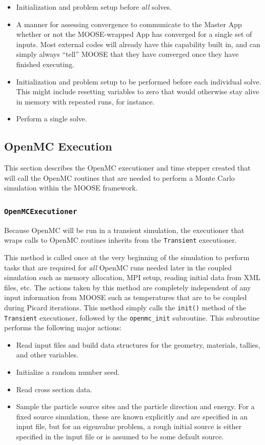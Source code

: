 \documentclass[10pt]{article}
\newcounter{subsubsubsection}[subsubsection]
\numberwithin{equation}{section} %
\begin{document}
\begin{itemize}
\item Initialization and problem setup before {\it all} solves.
\item A manner for assessing convergence to communicate to the Master App whether or not the MOOSE-wrapped App has converged for a single set of inputs. Most external codes will already have this capability built in, and can simply always ``tell'' MOOSE that they have converged once they have finished executing.
\item Initialization and problem setup to be performed before each individual solve. This might include resetting variables to zero that would otherwise stay alive in memory with repeated runs, for instance.
\item Perform a single solve.
\end{itemize}

\subsection{OpenMC Execution}
This section describes the OpenMC executioner and time stepper created that will call the OpenMC routines that are needed to perform a Monte Carlo simulation within the MOOSE framework. 

\subsubsection{{\tt OpenMCExecutioner}}
Because OpenMC will be run in a transient simulation, the executioner that wraps calls to OpenMC routines inherits from the {\tt Transient} executioner.

This method is called once at the very beginning of the simulation to perform tasks that are required for {\it all} OpenMC runs needed later in the coupled simulation such as memory allocation, MPI setup, reading initial data from XML files, etc. The actions taken by this method are completely independent of any input information from MOOSE such as temperatures that are to be coupled during Picard iterations. This method simply calls the {\tt init()} method of the {\tt Transient} executioner, followed by the {\tt openmc\_init} subroutine. This subroutine performs the following major actions:

\begin{itemize}
\item Read input files and build data structures for the geometry, materials, tallies, and other variables.
\item Initialize a random number seed.
\item Read cross section data.
\item Sample the particle source sites and the particle direction and energy. For a fixed source simulation, these are known explicitly and are specified in an input file, but for an eigenvalue problem, a rough initial source is either specified in the input file or is assumed to be some default source. 
\end{itemize}
\end{document}
